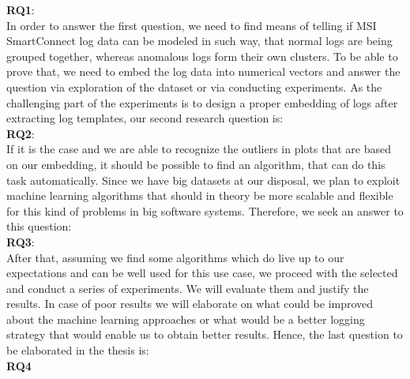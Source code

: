 \textbf{RQ1}: \textit{\RQFirst}\\
    
In order to answer the first question, we need to find means of telling if MSI SmartConnect log data can be modeled in such way, that normal logs are being grouped together, whereas anomalous logs form their own clusters. To be able to prove that, we need to embed the log data into numerical vectors and answer the question via exploration of the dataset or via conducting experiments. As the challenging part of the experiments is to design a proper embedding of logs after extracting log templates, our second research question is:\\ 

\textbf{RQ2}: \textit{\RQSecond}\\

If it is the case and we are able to recognize the outliers in plots that are based on our embedding, it should be possible to find an algorithm, that can do this task automatically. Since we have big datasets at our disposal, we plan to exploit machine learning algorithms that should in theory be more scalable and flexible for this kind of problems in big software systems.
Therefore, we seek an answer to this question:\\


\textbf{RQ3}: \textit{\RQThird}\\
    
After that, assuming we find some algorithms which do live up to our expectations and can be well used for this use case, we proceed with the selected and conduct a series of experiments.
We will evaluate them and justify the results. In case of poor results we will elaborate on what could be improved about the machine learning approaches or what would be a better logging strategy that would enable us to obtain better results.
Hence, the last question to be elaborated in the thesis is:\\

\textbf{RQ4} \textit{\RQFourth}\\ 
    

